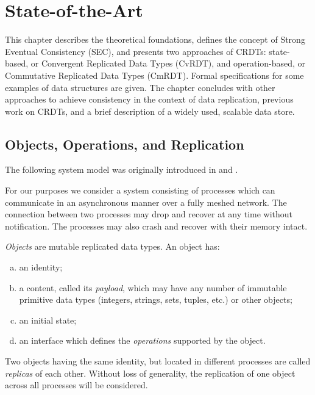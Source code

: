 \chapter{State-of-the-Art}
\label{ch:state_of_the_art}

This chapter describes the theoretical foundations, defines the concept of
Strong Eventual Consistency (SEC), and presents two approaches of CRDTs:
state-based, or Convergent Replicated Data Types (CvRDT), and operation-based,
or Commutative Replicated Data Types (CmRDT). Formal specifications for some
examples of data structures are given. The chapter concludes with other
approaches to achieve consistency in the context of data replication, previous
work on CRDTs, and a brief description of a widely used, scalable data store.

\section{Objects, Operations, and Replication}
\label{sec:objects_operations_and_replication}

The following system model was originally introduced in
\cite{shapiro:inria-00555588} and \cite{Shapiro:2011:CRD:2050613.2050642}. 

For our purposes we consider a system consisting of processes which can
communicate in an asynchronous manner over a fully meshed network. The
connection between two processes may drop and recover at any time without
notification. The processes may also crash and recover with their memory intact.

\textit{Objects} are mutable replicated data types. An object has:
\begin{enumerate}[(a)]
  \item an identity;
  \item a content, called its \textit{payload}, which may have any number of
  immutable primitive data types (integers, strings, sets, tuples, etc.) or
  other objects;
  \item an initial state;
  \item an interface which defines the \textit{operations} supported by the
  object.
\end{enumerate}

Two objects having the same identity, but located in different processes are
called \textit{replicas} of each other. Without loss of generality, the
replication of one object across all processes will be considered.


